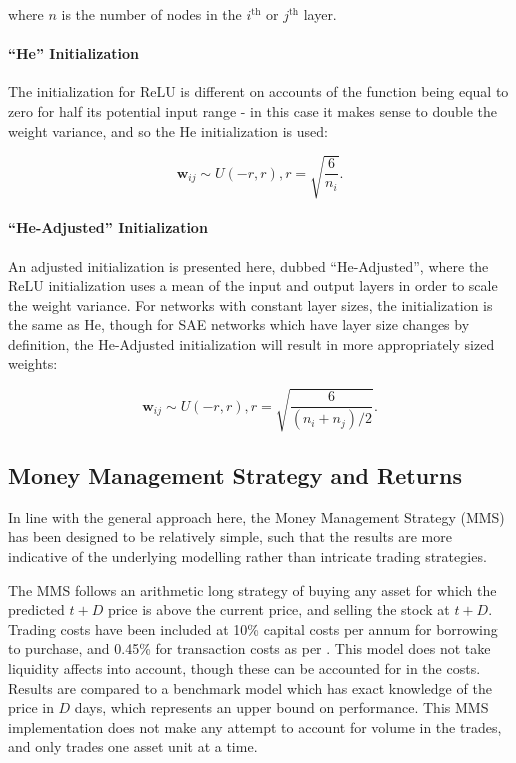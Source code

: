\documentclass[a4paper,11pt,oneside]{article}
\theoremstyle{plain}
\theoremstyle{definition}
\begin{document}
	where $n$ is the number of nodes in the $i^{\mathrm{th}}$ or $j^{\mathrm{th}}$ layer.
	\newline\newline
	\paragraph{``He'' Initialization} The initialization for ReLU is different on accounts of the function being equal to zero for half its potential input range - in this case it makes sense to double the weight variance, and so the He \citep{He} initialization is used:
	
	\begin{equation}
	\mathbf{w}_{ij} \sim U(-r, r), r = \sqrt{\frac{6}{n_i}} .
	\end{equation}
	
	
	\paragraph{``He-Adjusted'' Initialization} An adjusted initialization is presented here, dubbed ``He-Adjusted'', where the ReLU initialization uses a mean of the input and output layers in order to scale the weight variance. For networks with constant layer sizes, the initialization is the same as He, though for SAE networks which have layer size changes by definition, the He-Adjusted initialization will result in more appropriately sized weights:
	
	\begin{equation}
	\mathbf{w}_{ij} \sim U(-r, r), r = \sqrt{\frac{6}{(n_i + n_j)/2}} .
	\end{equation}
	
	
	\subsection{Money Management Strategy and Returns}\label{imp_mms}
	
	In line with the general approach here, the Money Management Strategy (MMS) has been designed to be relatively simple, such that the results are more indicative of the underlying modelling rather than intricate trading strategies. \newline
	
	The MMS follows an arithmetic long strategy of buying any asset for which the predicted ${t+D}$ price is above the current price, and selling the stock at ${t+D}$. Trading costs have been included at 10\% capital costs per annum for borrowing to purchase, and 0.45\% for transaction costs as per \citep{Loonat}. This model does not take liquidity affects into account, though these can be accounted for in the costs. Results are compared to a benchmark model which has exact knowledge of the price in $D$ days, which represents an upper bound on performance. This MMS implementation does not make any attempt to account for volume in the trades, and only trades one asset unit at a time.
	\hfill\break
	
\end{document}
